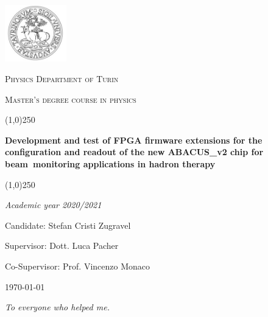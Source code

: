 \documentclass[10pt, a4paper, twoside, onpenany]{report}
\begin{document}
	
	\begin{titlepage}
		\centering
		\includegraphics[width=0.2\textwidth]{img/logo_unito.JPG}\par
		\vspace{1cm}
		{\scshape\LARGE Physics Department of Turin \par}
		{\scshape\LARGE Master's degree course in physics \par}
		\vspace{3.5cm}
		\line(1,0){250}\\
		{\Huge \textbf{Development and test of FPGA firmware extensions for the configuration and readout of the new ABACUS\_v2 chip for beam~monitoring applications in hadron therapy} \par}
		\line(1,0){250}\\	
		\vspace{2cm}
		{\Large\itshape Academic year 2020/2021\par}
		\vspace{1cm}
		{\large Candidate: Stefan Cristi Zugravel \par} 
		{\large Supervisor: Dott. Luca Pacher \par}
		{\large Co-Supervisor: Prof. Vincenzo Monaco \par}
		
		\vfill
		
		{\large \today\par}
	\end{titlepage}

	\begin{flushright}
		\textit{To everyone who helped me.}
	\end{flushright}

	
	
	\tableofcontents
		
	
	
	
	
	
	
	
	
	
	
	
	
	
	
	
	
\end{document}
